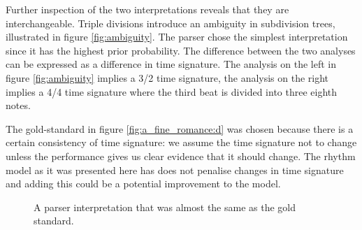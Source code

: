 Further inspection of the two interpretations reveals that they are interchangeable. Triple divisions introduce an ambiguity in subdivision trees, illustrated in figure \ref{fig:ambiguity}. The parser chose the simplest interpretation since it has the highest prior probability. The difference between the two analyses can be expressed as a difference in time signature. The analysis on the left in figure \ref{fig:ambiguity} implies a 3/2 time signature, the analysis on the right implies a 4/4 time signature where the third beat is divided into three eighth notes.

The gold-standard in figure \ref{fig:a_fine_romance:d} was chosen because there is a certain consistency of time signature: we assume the time signature not to change unless the performance gives us clear evidence that it should change. The rhythm model as it was presented here has does not penalise changes in time signature and adding this could be a potential improvement to the model.


\begin{figure}
\centering
{}



\caption{A parser interpretation that was almost the same as the gold standard.}
\label{fig:a_fine_romance}
\end{figure}

